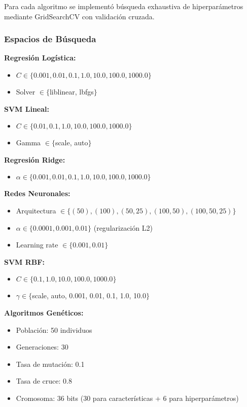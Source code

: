 \documentclass[12pt,a4paper]{article}
\begin{document}
Para cada algoritmo se implementó búsqueda exhaustiva de hiperparámetros mediante GridSearchCV con validación cruzada.

\subsubsection{Espacios de Búsqueda}

\textbf{Regresión Logística:}
\begin{itemize}
    \item $C \in \{0.001, 0.01, 0.1, 1.0, 10.0, 100.0, 1000.0\}$
    \item Solver $\in \{$liblinear, lbfgs$\}$
\end{itemize}

\textbf{SVM Lineal:}
\begin{itemize}
    \item $C \in \{0.01, 0.1, 1.0, 10.0, 100.0, 1000.0\}$
    \item Gamma $\in \{$scale, auto$\}$
\end{itemize}

\textbf{Regresión Ridge:}
\begin{itemize}
    \item $\alpha \in \{0.001, 0.01, 0.1, 1.0, 10.0, 100.0, 1000.0\}$
\end{itemize}

\textbf{Redes Neuronales:}
\begin{itemize}
    \item Arquitectura $\in \{(50), (100), (50,25), (100,50), (100,50,25)\}$
    \item $\alpha \in \{0.0001, 0.001, 0.01\}$ (regularización L2)
    \item Learning rate $\in \{0.001, 0.01\}$
\end{itemize}

\textbf{SVM RBF:}
\begin{itemize}
    \item $C \in \{0.1, 1.0, 10.0, 100.0, 1000.0\}$
    \item $\gamma \in \{$scale, auto, 0.001, 0.01, 0.1, 1.0, 10.0$\}$
\end{itemize}

\textbf{Algoritmos Genéticos:}
\begin{itemize}
    \item Población: 50 individuos
    \item Generaciones: 30
    \item Tasa de mutación: 0.1
    \item Tasa de cruce: 0.8
    \item Cromosoma: 36 bits (30 para características + 6 para hiperparámetros)
\end{itemize}
\end{document}
